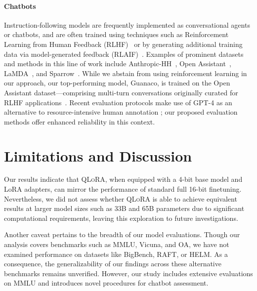 \paragraph{Chatbots} Instruction-following models are frequently implemented as conversational agents or chatbots, and are often trained using techniques such as Reinforcement Learning from Human Feedback (RLHF)~\citep{christiano2017deep} or by generating additional training data via model-generated feedback (RLAIF)~\citep{bai2022constitutional}. Examples of prominent datasets and methods in this line of work include Anthropic-HH~\citep{askell2021general,bai2022training}, Open Assistant~\citep{kopf2023openassistant}, LaMDA~\citep{thoppilan2022lamda}, and Sparrow~\citep{glaese2022improving}. While we abstain from using reinforcement learning in our approach, our top-performing model, Guanaco, is trained on the Open Assistant dataset—comprising multi-turn conversations originally curated for RLHF applications~\citep{kopf2023openassistant}. Recent evaluation protocols make use of GPT-4 as an alternative to resource-intensive human annotation \citep{vicuna2023,peng2023instruction}; our proposed evaluation methods offer enhanced reliability in this context.

\section{Limitations and Discussion}

Our results indicate that \textsc{QLoRA}, when equipped with a 4-bit base model and LoRA adapters, can mirror the performance of standard full 16-bit finetuning. Nevertheless, we did not assess whether \textsc{QLoRA} is able to achieve equivalent results at larger model sizes such as 33B and 65B parameters due to significant computational requirements, leaving this exploration to future investigations.

Another caveat pertains to the breadth of our model evaluations. Though our analysis covers benchmarks such as MMLU, Vicuna, and OA, we have not examined performance on datasets like BigBench, RAFT, or HELM. As a consequence, the generalizability of our findings across these alternative benchmarks remains unverified. However, our study includes extensive evaluations on MMLU and introduces novel procedures for chatbot assessment.


